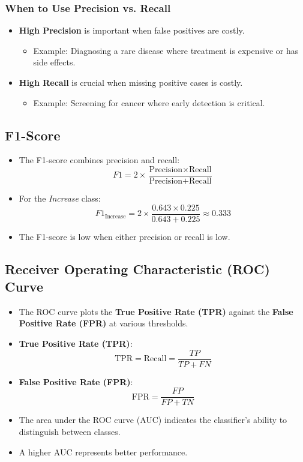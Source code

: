 \documentclass{article}
\begin{document}
\subsubsection{When to Use Precision vs. Recall}

\begin{itemize}
    \item \textbf{High Precision} is important when false positives are costly.
    \begin{itemize}
        \item Example: Diagnosing a rare disease where treatment is expensive or has side effects.
    \end{itemize}
    \item \textbf{High Recall} is crucial when missing positive cases is costly.
    \begin{itemize}
        \item Example: Screening for cancer where early detection is critical.
    \end{itemize}
\end{itemize}

\subsection{F1-Score}

\begin{itemize}
    \item The F1-score combines precision and recall:
    \[
    F1 = 2 \times \frac{\text{Precision} \times \text{Recall}}{\text{Precision} + \text{Recall}}
    \]
    \item For the \textit{Increase} class:
    \[
    F1_{\text{Increase}} = 2 \times \frac{0.643 \times 0.225}{0.643 + 0.225} \approx 0.333
    \]
    \item The F1-score is low when either precision or recall is low.
\end{itemize}

\subsection{Receiver Operating Characteristic (ROC) Curve}

\begin{itemize}
    \item The ROC curve plots the \textbf{True Positive Rate (TPR)} against the \textbf{False Positive Rate (FPR)} at various thresholds.
    \item \textbf{True Positive Rate (TPR)}:
    \[
    \text{TPR} = \text{Recall} = \frac{TP}{TP + FN}
    \]
    \item \textbf{False Positive Rate (FPR)}:
    \[
    \text{FPR} = \frac{FP}{FP + TN}
    \]
    \item The area under the ROC curve (AUC) indicates the classifier's ability to distinguish between classes.
    \item A higher AUC represents better performance.
\end{itemize}
\end{document}
